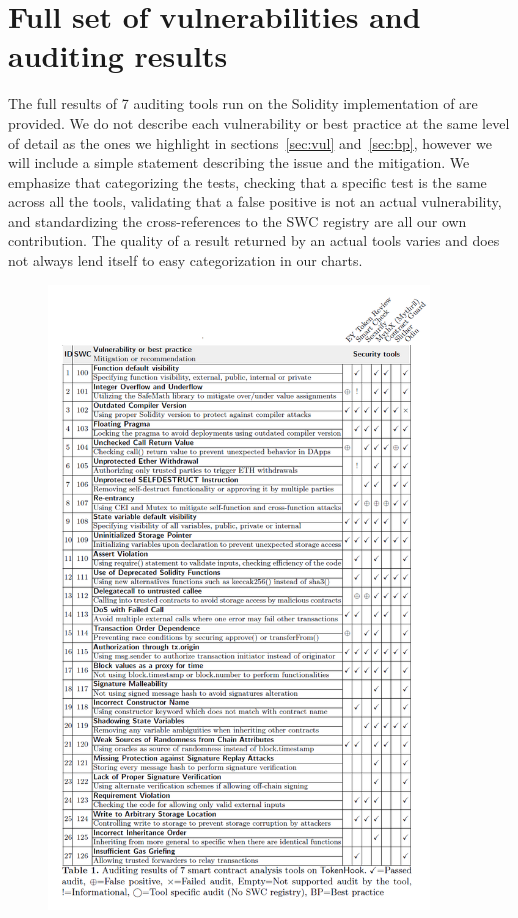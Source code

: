 
%
%
%

\section{Full set of vulnerabilities and auditing results}\label{subsec:audits}
The full results of 7 auditing tools run on the Solidity implementation of \sys are provided. We do not describe each vulnerability or best practice at the same level of detail as the ones we highlight in sections~\ref{sec:vul} and~\ref{sec:bp}, however we will include a simple statement describing the issue and the mitigation. We emphasize that categorizing the tests, checking that a specific test is the same across all the tools, validating that a false positive is not an actual vulnerability, and standardizing the cross-references to the SWC registry are all our own contribution. The quality of a result returned by an actual tools varies and does not always lend itself to easy categorization in our charts. 

\begin{figure}[t!]
	\centering
	\includegraphics[width=0.9\textwidth]{figures/table1.png}
\end{figure}

